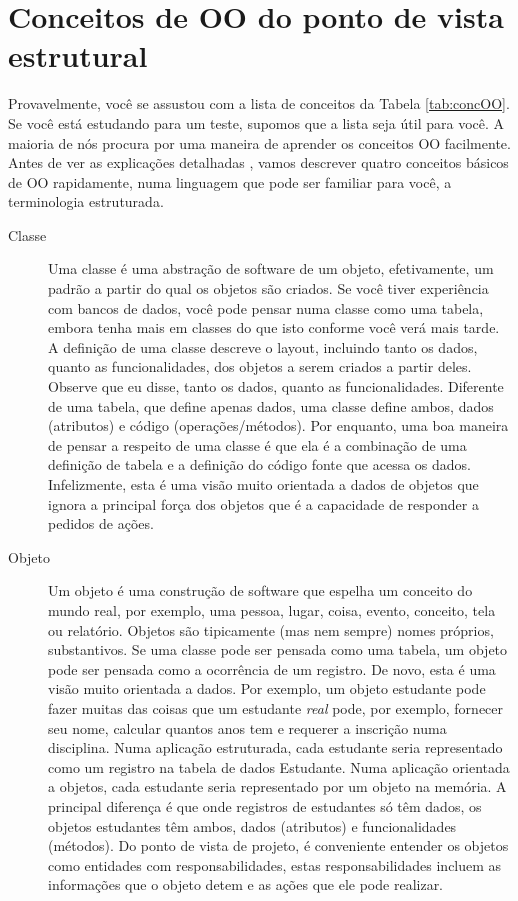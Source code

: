 \section{Conceitos de OO do ponto de vista estrutural}

Provavelmente, você se assustou com a lista de conceitos da Tabela \ref{tab:concOO}. Se você está estudando para um teste, supomos que a lista seja útil para você. A maioria de nós procura por uma maneira de aprender os conceitos OO facilmente. Antes de ver as explicações detalhadas , vamos descrever quatro conceitos básicos de OO rapidamente, numa linguagem que pode ser familiar para você, a terminologia estruturada.

\begin{description}
\item[Classe] Uma classe é uma abstração de software de um objeto, efetivamente, um padrão a partir do qual os objetos são criados. Se você tiver experiência com bancos de dados, você pode pensar numa classe como uma tabela, embora tenha mais em classes do que isto conforme você verá mais tarde. A definição de uma classe descreve o layout, incluindo tanto os dados, quanto as funcionalidades, dos objetos a serem criados a partir deles. Observe que eu disse, tanto os dados, quanto as funcionalidades. Diferente de uma tabela, que define apenas dados, uma classe define ambos, dados (atributos) e código (operações/métodos). Por enquanto, uma boa maneira de pensar a respeito de uma classe é que ela é a combinação de uma definição de tabela e a definição do código fonte que acessa os dados. Infelizmente, esta é uma visão muito orientada a dados de objetos que ignora a principal força dos objetos que é a capacidade de responder a pedidos de ações.

\item[Objeto] Um objeto é uma construção de software que espelha um conceito do mundo real, por exemplo, uma pessoa, lugar, coisa, evento, conceito, tela ou relatório. Objetos são tipicamente (mas nem sempre) nomes próprios, substantivos. Se uma classe pode ser pensada como uma tabela, um objeto pode ser pensada como a ocorrência de um registro. De novo, esta é uma visão muito orientada a dados. Por exemplo, um objeto estudante pode fazer muitas das coisas que um estudante \emph{real} pode, por exemplo, fornecer seu nome, calcular quantos anos tem e requerer a inscrição numa disciplina. Numa aplicação estruturada, cada estudante seria representado como um registro na tabela de dados Estudante. Numa aplicação orientada a objetos, cada estudante seria representado por um objeto na memória. A principal diferença é que onde registros de estudantes só têm dados, os objetos estudantes têm ambos, dados (atributos) e funcionalidades (métodos). Do ponto de vista de projeto, é conveniente entender os objetos como entidades com responsabilidades, estas responsabilidades incluem as informações que o objeto detem e as ações que ele pode realizar.


\end{description}
